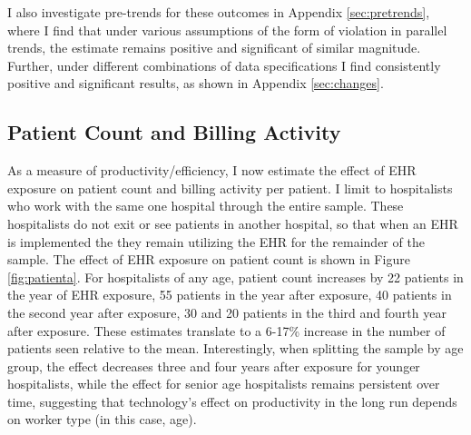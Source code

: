 \documentclass[12pt]{article}
\begin{document}
I also investigate pre-trends for these outcomes in Appendix \ref{sec:pretrends}, where I find that under various assumptions of the form of violation in parallel trends, the estimate remains positive and significant of similar magnitude. Further, under different combinations of data specifications I find consistently positive and significant results, as shown in Appendix \ref{sec:changes}. 


\subsection{Patient Count and Billing Activity}\label{sec:patientcount}

As a measure of productivity/efficiency, I now estimate the effect of EHR exposure on patient count and billing activity per patient. I limit to hospitalists who work with the same one hospital through the entire sample. These hospitalists do not exit or see patients in another hospital, so that when an EHR is implemented the they remain utilizing the EHR for the remainder of the sample. The effect of EHR exposure on patient count is shown in Figure \ref{fig:patienta}. For hospitalists of any age, patient count increases by 22 patients in the year of EHR exposure, 55 patients in the year after exposure, 40 patients in the second year after exposure, 30 and 20 patients in the third and fourth year after exposure. These estimates translate to a 6-17\% increase in the number of patients seen relative to the mean. Interestingly, when splitting the sample by age group, the effect decreases three and four years after exposure for younger hospitalists, while the effect for senior age hospitalists remains persistent over time, suggesting that technology's effect on productivity in the long run depends on worker type (in this case, age). 
\end{document}
